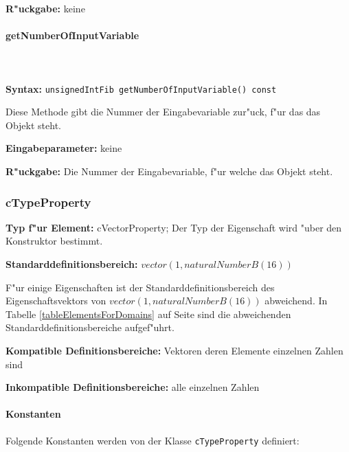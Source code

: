 \bigskip\noindent
\textbf{R"uckgabe:} keine


\paragraph{getNumberOfInputVariable}

\ \\\\\noindent
\textbf{Syntax:} \verb|unsignedIntFib getNumberOfInputVariable() const|

\bigskip\noindent
Diese Methode gibt die Nummer der Eingabevariable zur"uck, f"ur das das Objekt steht.

\bigskip\noindent
\textbf{Eingabeparameter:} keine

\bigskip\noindent
\textbf{R"uckgabe:} Die Nummer der Eingabevariable, f"ur welche das Objekt steht.



\subsubsection{cTypeProperty}

\textbf{Typ f"ur Element:} cVectorProperty; Der Typ der Eigenschaft wird "uber den Konstruktor bestimmt.

\bigskip\noindent
\textbf{Standarddefinitionsbereich:} $vector( 1 , naturalNumberB(16) )$

F"ur einige Eigenschaften ist der Standarddefinitionsbereich des Eigenschaftsvektors von $vector( 1 , naturalNumberB(16) )$ abweichend. In Tabelle \ref{tableElementsForDomains} auf Seite \pageref{tableElementsForDomains} sind die abweichenden Standarddefinitionsbereiche aufgef"uhrt.

\bigskip\noindent
\textbf{Kompatible Definitionsbereiche:} Vektoren deren Elemente einzelnen Zahlen sind

\bigskip\noindent
\textbf{Inkompatible Definitionsbereiche:} alle einzelnen Zahlen


\paragraph{Konstanten}

Folgende Konstanten werden von der Klasse \verb|cTypeProperty| definiert:

